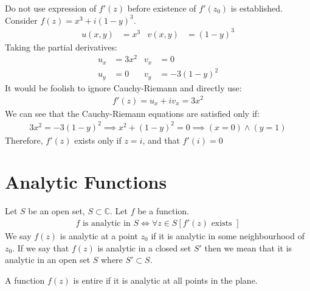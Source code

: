 \documentclass[12pt, english]{book}
\begin{document}
	\begin{example}
		Do not use expression of \(f'(z)\) before existence of \(f'(z_0)\)  is established.
		Consider \(f(z) = x^3 + i(1-y)^3\).
		\begin{align*}
			u(x,y) &= x^3	& 	v(x,y) &= (1-y)^3
		\end{align*}
		Taking the partial derivatives:
		\begin{align*}
			u_x &= 3x^2	& 	v_x &= 0\\
			u_y &= 0	&	v_y &= -3(1-y)^2
		\end{align*}
		It would be foolish to ignore Cauchy-Riemann and directly use:
		\begin{align*}
			f'(z) = u_x + iv_x = 3x^2
		\end{align*}
		We can see that the Cauchy-Riemann equations are satisfied only if:
		\begin{align*}
			3x^2 = -3(1-y)^2 \implies  x^2 + (1-y)^2 = 0 \implies (x=0)\land(y=1)
		\end{align*}
		Therefore, \(f'(z)\) exists only if \(z = i\), and that \(f'(i) = 0\)
	\end{example}
	
	\section{Analytic Functions} \label{Analytic Functions Section - Complex}
	
	\begin{definition}
		  
		\label{Analytic Definition - Complex}
		Let $S$ be an open set, \(S \subset \mathbb{C}\). Let \(f\) be a function.
		\begin{align*}
			f \text{ is analytic in } S \iff \forall z \in S[ f'(z) \text{ exists }]
		\end{align*}
		We say \(f(z)\) is analytic at a point \(z_0\) if it is analytic in some neighbourhood of \(z_0\). If we say that \(f(z)\) is analytic in a closed set \(S'\) then we mean that it is analytic in an open set \(S\) where \(S' \subset S\).
	\end{definition}
	
	\begin{definition}[Entire] 
		A function \(f(z)\) is entire if it is analytic at all points in the plane. 
	\end{definition}
\end{document}
